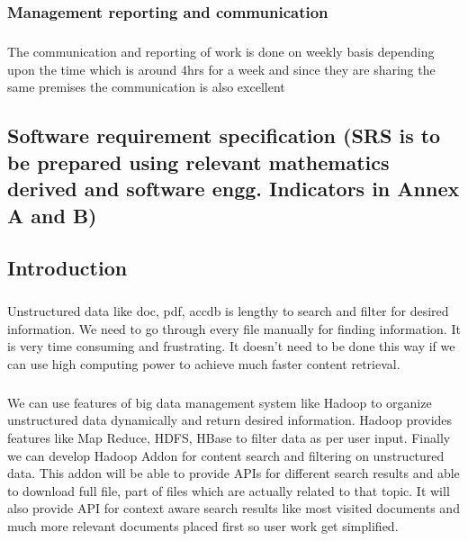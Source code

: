\documentclass[oneside,a4paper,12pt]{report}
\begin{document}
\subsection{Management reporting and communication}
\paragraph{}
The communication and reporting of work is done on weekly basis depending upon the time which is around 4hrs for a week and since they are sharing the same premises the communication is also excellent


\begin{center}
\chapter{Software requirement specification (SRS is to be prepared using relevant mathematics derived and software engg. Indicators in Annex A and B)}
\end{center}
\newpage

\section{Introduction}
\paragraph{} 
Unstructured data like doc, pdf, accdb is lengthy to search and filter for desired information. We need to go through every file manually for finding information. It is very time consuming and frustrating. It doesn’t need to be done this way if we can use high computing power to achieve much faster content retrieval. 

\paragraph{} 
We can use features of big data management system like Hadoop to organize unstructured data dynamically and return desired information. Hadoop provides features like Map Reduce, HDFS, HBase to filter data as per user input. Finally we can develop Hadoop Addon for content search and filtering on unstructured data. This addon will be able to provide APIs for different search results and able to download full file, part of files which are actually related to that topic. It will also provide API for context aware search results like most visited documents and much more relevant documents placed first so user work get simplified.  
\end{document}
